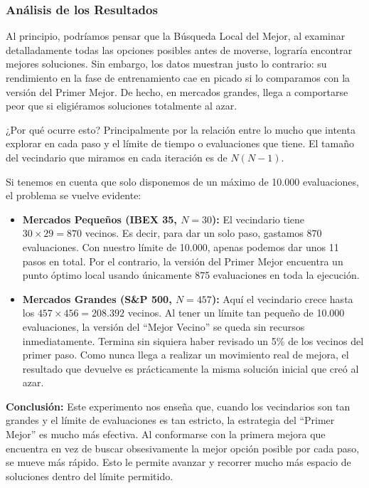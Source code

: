 \subsubsection{Análisis de los Resultados}
Al principio, podríamos pensar que la Búsqueda Local del Mejor, al examinar detalladamente todas las opciones posibles antes de moverse, lograría encontrar mejores soluciones. Sin embargo, los datos muestran justo lo contrario: su rendimiento en la fase de entrenamiento cae en picado si lo comparamos con la versión del Primer Mejor. De hecho, en mercados grandes, llega a comportarse peor que si eligiéramos soluciones totalmente al azar.

¿Por qué ocurre esto? Principalmente por la relación entre lo mucho que intenta explorar en cada paso y el límite de tiempo o evaluaciones que tiene. El tamaño del vecindario que miramos en cada iteración es de $N(N-1)$. 

Si tenemos en cuenta que solo disponemos de un máximo de 10.000 evaluaciones, el problema se vuelve evidente:
\begin{itemize}
    \item \textbf{Mercados Pequeños (IBEX 35, $N=30$):} El vecindario tiene $30 \times 29 = 870$ vecinos. Es decir, para dar un solo paso, gastamos 870 evaluaciones. Con nuestro límite de 10.000, apenas podemos dar unos 11 pasos en total. Por el contrario, la versión del Primer Mejor encuentra un punto óptimo local usando únicamente 875 evaluaciones en toda la ejecución.
    \item \textbf{Mercados Grandes (S\&P 500, $N=457$):} Aquí el vecindario crece hasta los $457 \times 456 = 208.392$ vecinos. Al tener un límite tan pequeño de 10.000 evaluaciones, la versión del ``Mejor Vecino'' se queda sin recursos inmediatamente. Termina sin siquiera haber revisado un 5\% de los vecinos del primer paso. Como nunca llega a realizar un movimiento real de mejora, el resultado que devuelve es prácticamente la misma solución inicial que creó al azar.
\end{itemize}

\textbf{Conclusión:} Este experimento nos enseña que, cuando los vecindarios son tan grandes y el límite de evaluaciones es tan estricto, la estrategia del ``Primer Mejor'' es mucho más efectiva. Al conformarse con la primera mejora que encuentra en vez de buscar obsesivamente la mejor opción posible por cada paso, se mueve más rápido. Esto le permite avanzar y recorrer mucho más espacio de soluciones dentro del límite permitido.

